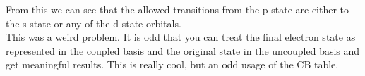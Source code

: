 \documentclass[10pt]{article} %
\begin{document}
From this we can see that the allowed transitions from the p-state are either to the s state
or any of the d-state orbitals.\\

This was a weird problem. It is odd that you can treat the final electron state as
represented in the coupled basis and the original state in the uncoupled basis and get
meaningful results. This is really cool, but an odd usage of the CB table.\\
\end{document}
